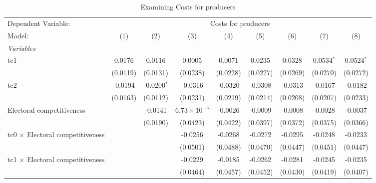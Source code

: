 
\begin{table}[htbp]
   \caption{Examining Costs for producers}
   \centering
   \begin{tabular}{lcccccccc}
      \tabularnewline \midrule \midrule
      Dependent Variable: & \multicolumn{8}{c}{Costs for producers}\\
      Model:                                  & (1)      & (2)           & (3)                   & (4)      & (5)      & (6)          & (7)          & (8)\\  
      \midrule
      \emph{Variables}\\
      tc1                                     & 0.0176   & 0.0116        & 0.0005                & 0.0071   & 0.0235   & 0.0328       & 0.0534$^{*}$ & 0.0524$^{*}$\\   
                                              & (0.0119) & (0.0131)      & (0.0238)              & (0.0228) & (0.0227) & (0.0269)     & (0.0270)     & (0.0272)\\   
      tc2                                     & -0.0194  & -0.0200$^{*}$ & -0.0316               & -0.0320  & -0.0308  & -0.0313      & -0.0167      & -0.0182\\   
                                              & (0.0163) & (0.0112)      & (0.0231)              & (0.0219) & (0.0214) & (0.0208)     & (0.0207)     & (0.0233)\\   
      Electoral competitiveness               &          & -0.0141       & $6.73\times 10^{-5}$  & -0.0026  & -0.0009  & -0.0008      & -0.0028      & -0.0037\\   
                                              &          & (0.0190)      & (0.0423)              & (0.0422) & (0.0397) & (0.0372)     & (0.0375)     & (0.0366)\\   
      tc0 $\times$ Electoral competitiveness  &          &               & -0.0256               & -0.0268  & -0.0272  & -0.0295      & -0.0248      & -0.0233\\   
                                              &          &               & (0.0501)              & (0.0488) & (0.0470) & (0.0447)     & (0.0451)     & (0.0447)\\   
      tc1 $\times$ Electoral competitiveness  &          &               & -0.0229               & -0.0185  & -0.0262  & -0.0281      & -0.0245      & -0.0235\\   
                                              &          &               & (0.0464)              & (0.0457) & (0.0452) & (0.0430)     & (0.0419)     & (0.0407)\\   

\end{tabular}
\end{table}
